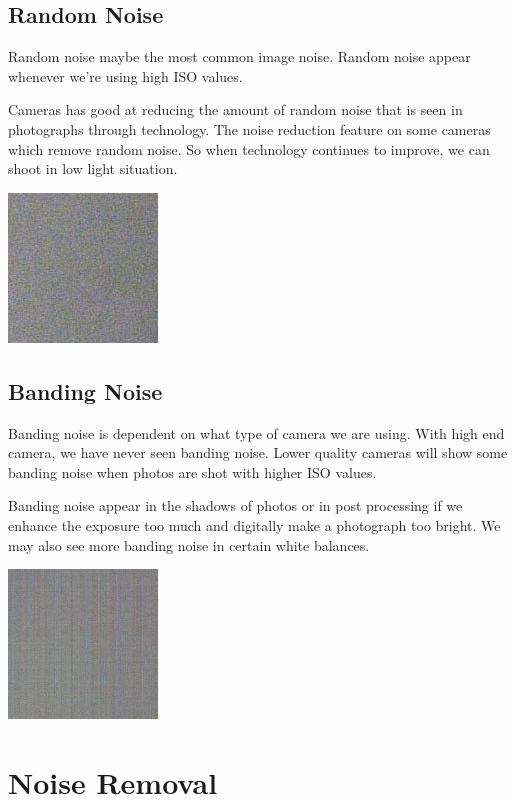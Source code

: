 \documentclass[10pt]{article}
\begin{document}
\subsection{Random Noise}
Random noise maybe the most common image noise. Random noise appear whenever we’re using high ISO values.

Cameras has good at reducing the amount of random noise that is seen in photographs through technology. The noise reduction feature on some cameras which remove random noise. So when technology continues to improve, we can shoot in low light situation. 

\begin{center}
	\includegraphics{random.png}
\end{center}

\subsection{Banding Noise}
Banding noise is dependent on what type of camera we are using. With high end camera, we have never seen banding noise. Lower quality cameras will show some banding noise when photos are shot with higher ISO values.

Banding noise appear in the shadows of photos or in post processing if we enhance the exposure too much and digitally make a photograph too bright. We may also see more banding noise in certain white balances.

\begin{center}
	\includegraphics{banding.png}
\end{center}


\section{Noise Removal}
\end{document}
